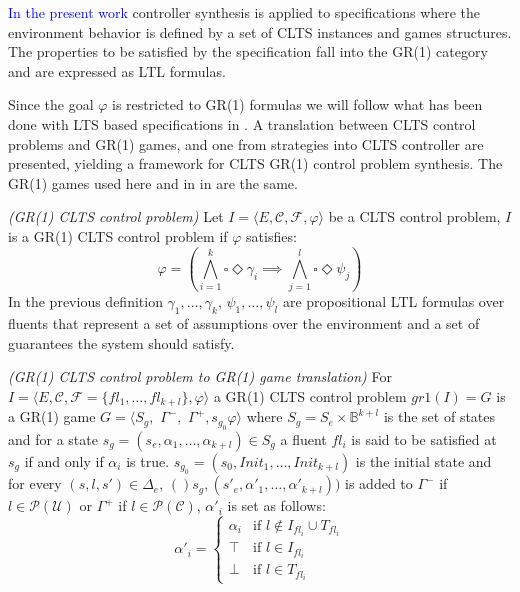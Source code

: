 \textcolor{blue}{In the present work} controller synthesis is applied to specifications where the environment behavior is defined by a set of CLTS instances and games structures. The properties to be satisfied by the specification fall into the GR(1) category and are expressed as LTL formulas.

Since the goal $\varphi$ is restricted to GR(1) formulas we will follow what has been done with LTS based specifications in \cite{DBLP:phd/ethos/DIppolito13}. A translation between CLTS control problems and GR(1) games, and one from strategies into CLTS controller are presented, yielding a framework for CLTS GR(1) control problem synthesis. The GR(1) games used here and in in \cite{DBLP:phd/ethos/DIppolito13} are the same.

\begin{definition}\label{def:gr1_clts_control_problem} \emph{(GR(1) CLTS control problem)} 
	Let $I = \langle E, \mathcal{C}, \mathcal{F}, \varphi \rangle$ be a CLTS control problem, $I$ is a GR(1) CLTS control problem if $\varphi$ satisfies: 
	\[\varphi = (\bigwedge_{i=1}^k\square \Diamond \gamma_i \implies \bigwedge_{j=1}^l\square \Diamond \psi_j)\]
	In the previous definition $\gamma_1, \ldots , \gamma_k$, $\psi_1, \ldots , \psi_l$ are propositional LTL formulas over fluents that represent a set of assumptions over the environment and a set of guarantees the system should satisfy.
\end{definition}

\begin{definition}\label{def:clts_to_gr1_translation} \emph{(GR(1) CLTS control problem to GR(1) game translation)} 
For $I = \langle E, \mathcal{C}, \mathcal{F}=\lbrace fl_1, \ldots, fl_{k+l} \rbrace, \varphi \rangle$ a GR(1) CLTS control problem $gr1(I)=G$ is a GR(1) game $G = \langle S_g,$ $\Gamma^-,$ $\Gamma^+,s_{g_0}\varphi \rangle$ where $S_g = S_e \times \mathbb{B}^{k+l}$ is the set of states and for a state $s_g=(s_e,\alpha_1,\ldots,\alpha_{k+l}) \in S_g$ a fluent
$fl_i$ is said to be satisfied at $s_g$ if and only if $\alpha_i$ is true.
$s_{g_0}=(s_0,Init_1,\ldots,Init_{k+l})$ is the initial state and for every $(s,l,s')\in \Delta_e$, $()s_g,(s'_e,\alpha'_1,\ldots,\alpha'_{k+l}))$ is added to $\Gamma^-$ if $l \in \mathcal{P}(\mathcal{U})$ or $\Gamma^+$ if $l \in \mathcal{P}(\mathcal{C})$, $\alpha'_i$ is set as follows:
\[
\alpha'_i = \begin{cases}
\alpha_i & \text{if } l \notin I_{fl_i} \cup T_{fl_i} \\
\top & \text{if } l \in I_{fl_i}\\
\bot & \text{if } l \in T_{fl_i}
\end{cases}
\]
\end{definition}

